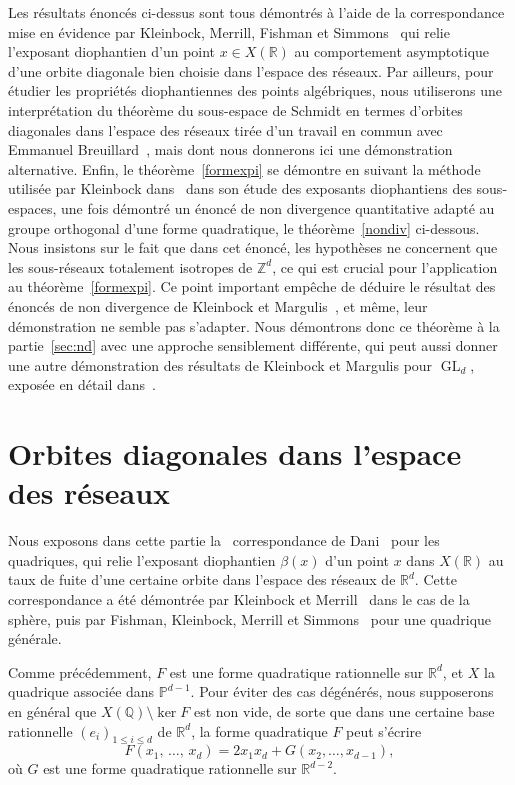 \documentclass[AHL,Unicode,longabstracts,francais,published]{cedram}
\DeclareMathOperator{\GL}{GL}
\newcommand{\R}{\mathbb{R}}
\newcommand{\Z}{\mathbb{Z}}
\newcommand{\Q}{\mathbb{Q}}
\newcommand{\PP}{\mathbb{P}}
\begin{document}
Les résultats énoncés ci-dessus sont tous démontrés à l'aide de la correspondance mise en évidence par Kleinbock, Merrill, Fishman et Simmons~\cite{kleinbock-merrill,fkms_quadric} qui relie l'exposant diophantien d'un point $x\in X(\R)$ au comportement asymptotique d'une orbite diagonale bien choisie dans l'espace des réseaux. Par ailleurs, pour étudier les propriétés diophantiennes des points algébriques, nous utiliserons une interprétation du théorème du sous-espace de Schmidt en termes d'orbites diagonales dans l'espace des réseaux tirée d'un travail en commun avec Emmanuel Breuillard~\cite{breuillardsaxce}, mais dont nous donnerons ici une démonstration alternative. Enfin, le théorème~\ref{formexpi} se démontre en suivant la méthode utilisée par Kleinbock dans~\cite{kleinbock_anextension} dans son étude des exposants diophantiens des sous-espaces, une fois démontré un énoncé de non divergence quantitative adapté au groupe orthogonal d'une forme quadratique, le théorème~\ref{nondiv} ci-dessous. Nous insistons sur le fait que dans cet énoncé, les hypothèses ne concernent que les sous-réseaux totalement isotropes de $\Z^d$, ce qui est crucial pour l'application au théorème~\ref{formexpi}. Ce point important empêche de déduire le résultat des énoncés de non divergence de Kleinbock et Margulis~\cite{kleinbockmargulis,kleinbock_anextension}, et même, leur démonstration ne semble pas s'adapter. Nous démontrons donc ce théorème à la partie~\ref{sec:nd} avec une approche sensiblement différente, qui peut aussi donner une autre démonstration des résultats de Kleinbock et Margulis pour $\GL_d$, exposée en détail dans~\cite{saxce_hnnondivergence}.



\section{Orbites diagonales dans l'espace des réseaux}\label{sec:dani}

Nous exposons dans cette partie la \og~correspondance de Dani~\fg{} pour les quadriques, qui relie l'exposant diophantien $\beta(x)$ d'un point $x$ dans $X(\R)$ au taux de fuite d'une certaine orbite dans l'espace des réseaux de $\R^d$. Cette correspondance a été démontrée par Kleinbock et Merrill~\cite{kleinbock-merrill} dans le cas de la sphère, puis par Fishman, Kleinbock, Merrill et Simmons~\cite{fkms_quadric} pour une quadrique générale.


Comme précédemment, $F$ est une forme quadratique rationnelle sur $\R^d$, et $X$ la quadrique associée dans $\PP^{d-1}$. Pour éviter des cas dégénérés, nous supposerons en général que $X(\Q)\setminus\ker F$ est non vide, de sorte que dans une certaine base rationnelle $(e_i)_{1\leq i\leq d}$ de $\R^d$, la forme quadratique $F$ peut s'écrire
\[
F\left(x_1,\,\dots,\,x_d\right) = 2x_1x_d + G\left(x_2,\dots,x_{d-1}\right),
\]
où $G$ est une forme quadratique rationnelle sur $\R^{d-2}$.
\end{document}
